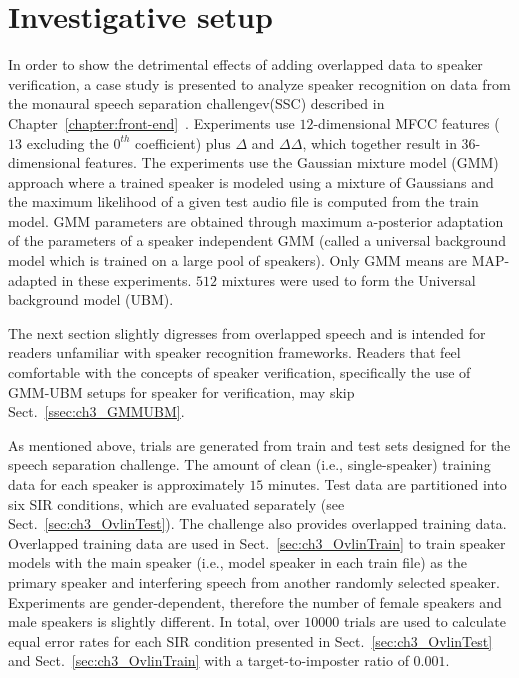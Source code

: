 \section{Investigative setup}
\label{sec:ch3_SIDintro}
In order to show the detrimental effects of adding overlapped data to speaker verification, a case study is presented to analyze speaker recognition on data from the monaural speech separation challengev(SSC) described in Chapter~\ref{chapter:front-end}~\cite{cooke20101}. 
Experiments use $12$-dimensional MFCC features ($13$ excluding the $0^{th}$ coefficient) plus $\Delta$ and $\Delta\Delta$, which together result in $36$-dimensional features. 
The experiments use the Gaussian mixture model (GMM) approach where a trained speaker is modeled using a mixture of Gaussians and the maximum likelihood of a given test audio file is computed from the train model. 
GMM parameters are obtained through maximum a-posterior adaptation of the parameters of a speaker independent GMM (called a universal background model which is trained on a large pool of speakers). 
Only GMM means are MAP-adapted in these experiments. 
$512$ mixtures were used to form the Universal background model (UBM). 

The next section slightly digresses from overlapped speech and is intended for readers unfamiliar with speaker recognition frameworks. 
Readers that feel comfortable with the concepts of speaker verification, specifically the use of GMM-UBM setups for speaker for verification, may skip Sect.~\ref{ssec:ch3_GMMUBM}.

As mentioned above, trials are generated from train and test sets designed for the speech separation challenge. 
The amount of clean (i.e., single-speaker) training data for each speaker is approximately $15$ minutes. 
Test data are partitioned into six SIR conditions, which are evaluated separately (see Sect.~\ref{sec:ch3_OvlinTest}). 
The challenge also provides overlapped training data. 
Overlapped training data are used in Sect.~\ref{sec:ch3_OvlinTrain} to train speaker models with the main speaker (i.e., model speaker in each train file) as the primary speaker and interfering speech from another randomly selected speaker. 
Experiments are gender-dependent, therefore the number of female speakers and male speakers is slightly different. 
In total, over $10000$ trials are used to calculate equal error rates for each SIR condition presented in Sect.~\ref{sec:ch3_OvlinTest} and Sect.~\ref{sec:ch3_OvlinTrain} with a target-to-imposter ratio of $0.001$. 

